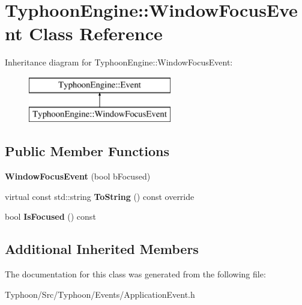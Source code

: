 \hypertarget{class_typhoon_engine_1_1_window_focus_event}{}\section{Typhoon\+Engine\+::Window\+Focus\+Event Class Reference}
\label{class_typhoon_engine_1_1_window_focus_event}
Inheritance diagram for Typhoon\+Engine\+::Window\+Focus\+Event\+:\begin{figure}[H]
\begin{center}
\leavevmode
\includegraphics[height=2.000000cm]{class_typhoon_engine_1_1_window_focus_event}
\end{center}
\end{figure}
\subsection*{Public Member Functions}
\begin{DoxyCompactItemize}
\item 
\mbox{\label{class_typhoon_engine_1_1_window_focus_event_a6f15e4a4a75413454e27758ee42284d6}} 
{\bfseries Window\+Focus\+Event} (bool b\+Focused)
\item 
\mbox{\label{class_typhoon_engine_1_1_window_focus_event_a342ae78c82e4bc13ef38fc3062f5f539}} 
virtual const std\+::string {\bfseries To\+String} () const override
\item 
\mbox{\label{class_typhoon_engine_1_1_window_focus_event_a07408d0fde5f4cd5fe2ec6d35f604f30}} 
bool {\bfseries Is\+Focused} () const
\end{DoxyCompactItemize}
\subsection*{Additional Inherited Members}


The documentation for this class was generated from the following file\+:\begin{DoxyCompactItemize}
\item 
Typhoon/\+Src/\+Typhoon/\+Events/Application\+Event.\+h\end{DoxyCompactItemize}
